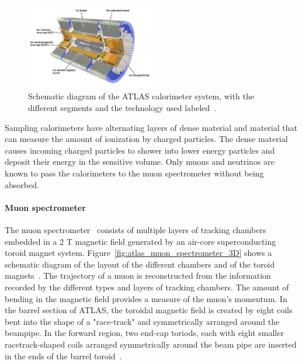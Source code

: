 \begin{figure}
    \centering
    \includegraphics[width = 0.5\textwidth]{figures/atlas_calorimeter.png}
    \caption{Schematic diagram of the ATLAS calorimeter system, with the different segments and the technology used labeled~\cite{collaboration_atlas_2008}.}
    \label{fig:atlas_calorimeter}
\end{figure}

Sampling calorimeters have alternating layers of dense material and material that can measure the amount of ionization by charged particles. The dense material causes incoming charged particles to shower into lower energy particles and deposit their energy in the sensitive volume. Only muons and neutrinos are known to pass the calorimeters to the muon spectrometer without being absorbed. 

\paragraph*{Muon spectrometer} \hfill \break
The muon spectrometer~\cite{atlas_muon_spectrometer_tdr} consists of multiple layers of tracking chambers embedded in a 2 T magnetic field generated by an air-core superconducting toroid magnet system. Figure~\ref{fig:atlas_muon_spectrometer_3D} shows a schematic diagram of the layout of the different chambers and of the toroid magnets~\cite{collaboration_atlas_2008}. The trajectory of a muon is reconstructed from the information recorded by the different types and layers of tracking chambers. The amount of bending in the magnetic field provides a measure of the muon's momentum. In the barrel section of ATLAS, the toroidal magnetic field is created by eight coils bent into the shape of a  "race-track"  and symmetrically arranged around the beampipe.  In the forward region, two end-cap toriods, each with eight smaller racetrack-shaped coils arranged symmetrically around the beam pipe are inserted in the ends of the barrel toroid~\cite{atlas_magnet_tdr}.

